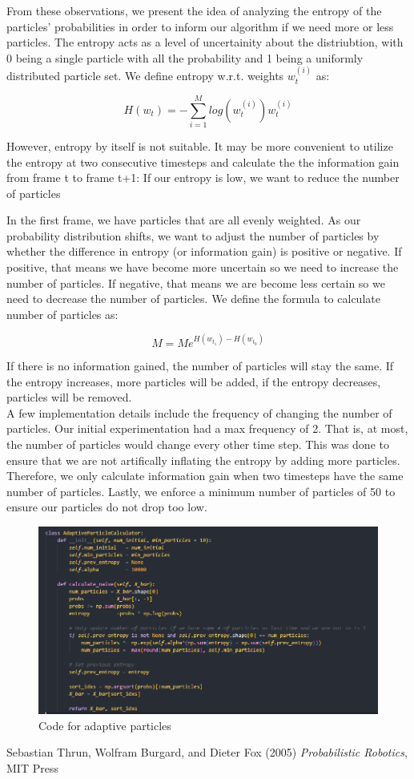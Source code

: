 \documentclass[12pt, a4paper]{article}
\begin{document}
\noindent From these observations, we present the idea of analyzing the entropy of the particles' probabilities in order to inform our algorithm if we need more or less particles. The entropy acts as a level of uncertainity about the distriubtion, with 0 being a single particle with all the probability and 1 being a uniformly distributed particle set. We define entropy w.r.t. weights $w_t^{(i)}$ as:

$$ H(w_t) = - \sum_{i=1}^{M} log(w_t^{(i)})w_t^{(i)} $$


\noindent However, entropy by itself is not suitable. It may be more convenient to utilize the entropy at two consecutive timesteps and calculate the the information gain from frame t to frame t+1:
If our entropy is low, we want to reduce the number of particles


\noindent In the first frame, we have particles that are all evenly weighted. As our probability distribution shifts, we want to adjust the number of particles by whether the difference in entropy (or information gain) is positive or negative. If positive, that means we have become more uncertain so we need to increase the number of particles. If negative, that means we are become less certain so we need to decrease the number of particles.
We define the formula to calculate number of particles as:

$$M = Me^{H(w_{t_1}) - H(w_{t_0})}$$

\noindent If there is no information gained, the number of particles will stay the same. If the entropy increases, more particles will be added, if the entropy decreases, particles will be removed.\\

\noindent A few implementation details include the frequency of changing the number of particles. Our initial experimentation had a max frequency of 2. That is, at most, the number of particles would change every other time step. This was done to ensure that we are not artifically inflating the entropy by adding more particles. Therefore, we only calculate information gain when two timesteps have the same number of particles. Lastly, we enforce a minimum number of particles of 50 to ensure our particles do not drop too low.

\begin{figure}[H]
  \centering
  \includegraphics[width=0.9\linewidth]{results/adaptive_particles.PNG}
  \caption{Code for adaptive particles}
\end{figure}

\begin{thebibliography}{9}
  Sebastian Thrun, Wolfram Burgard, and Dieter Fox (2005) \emph{Probabilistic Robotics}, MIT Press
\end{thebibliography}
\end{document}
